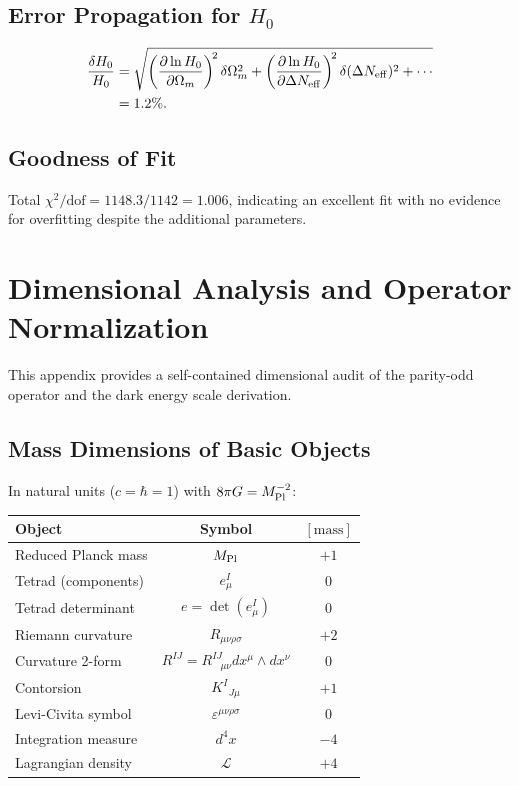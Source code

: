 \documentclass[aps,prd,twocolumn,superscriptaddress,showpacs,preprintnumbers,nofootinbib,longbibliography,floatfix]{revtex4-2}
\newcommand{\MPl}{M_{\rm Pl}}
\newcommand{\Neff}{N_{\rm eff}}
\begin{document}
\subsection{Error Propagation for $H_0$}

\begin{align}
\frac{\delta H_0}{H_0} &= \sqrt{\left(\frac{\partial \ln H_0}{\partial \Omega_m}\right)^{\!2} \delta\Omega_m^2 + \left(\frac{\partial \ln H_0}{\partial \Delta\Neff}\right)^{\!2} \delta(\Delta\Neff)^2 + \cdots}\nonumber\\
&= 1.2\%.
\end{align}

\subsection{Goodness of Fit}

Total $\chi^2/\text{dof} = 1148.3/1142 = 1.006$, indicating an excellent fit with no evidence for overfitting despite the additional parameters.




\section{Dimensional Analysis and Operator Normalization}\label{app:dimensions}

This appendix provides a self-contained dimensional audit of the parity-odd operator and the dark energy scale derivation.

\subsection{Mass Dimensions of Basic Objects}

In natural units ($c = \hbar = 1$) with $8\pi G = \MPl^{-2}$:
\begin{center}
\begin{tabular}{lcc}
Object & Symbol & $[\text{mass}]$ \\
\hline
Reduced Planck mass & $\MPl$ & $+1$ \\
Tetrad (components) & $e^I_\mu$ & $0$ \\
Tetrad determinant & $e = \det(e^I_\mu)$ & $0$ \\
Riemann curvature & $R_{\mu\nu\rho\sigma}$ & $+2$ \\
Curvature 2-form & $R^{IJ} = R^{IJ}_{\;\;\;\mu\nu}dx^\mu\wedge dx^\nu$ & $0$ \\
Contorsion & $K^I_{\;\;J\mu}$ & $+1$ \\
Levi-Civita symbol & $\varepsilon^{\mu\nu\rho\sigma}$ & $0$ \\
Integration measure & $d^4x$ & $-4$ \\
Lagrangian density & $\mathcal{L}$ & $+4$ \\
\end{tabular}
\end{center}
\end{document}

